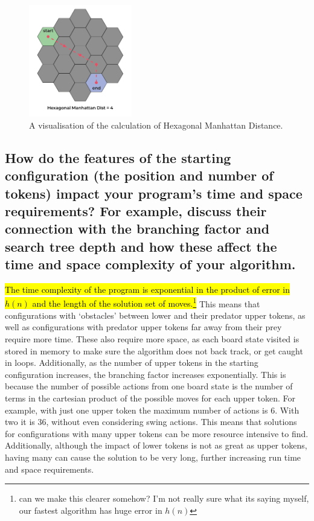\documentclass{article}
\begin{document}
\begin{figure}
    \centering
    \includegraphics[width=0.4\textwidth]{hex-manhattan.png}
    \caption{A visualisation of the calculation of Hexagonal Manhattan Distance.}
    \label{fig: hex manhattan}
\end{figure}

\subsection*{How do the features of the starting configuration (the position and number of tokens) impact your program’s time and space requirements? For example, discuss their connection with the branching factor and search tree depth and how these affect the time and space complexity of your algorithm.}
\hl{The time complexity of the program is exponential in the product of error in $h(n)$ and the length of the solution set of moves.\footnote{can we make this clearer somehow? I'm not really sure what its saying myself, our fastest algorithm has huge error in $h(n)$}} This means that configurations with ‘obstacles’ between lower and their predator upper tokens, as well as configurations with predator upper tokens far away from their prey require more time. These also require more space, as each board state visited is stored in memory to make sure the algorithm does not back track, or get caught in loops. Additionally, as the number of upper tokens in the starting configuration increases, the branching factor increases exponentially. This is because the number of possible actions from one board state is the number of terms in the cartesian product of the possible moves for each upper token. For example, with just one upper token the maximum number of actions is 6. With two it is 36, without even considering swing actions. This means that solutions for configurations with many upper tokens can be more resource intensive to find. Additionally, although the impact of lower tokens is not as great as upper tokens, having many can cause the solution to be very long, further increasing run time and space requirements.
\end{document}
